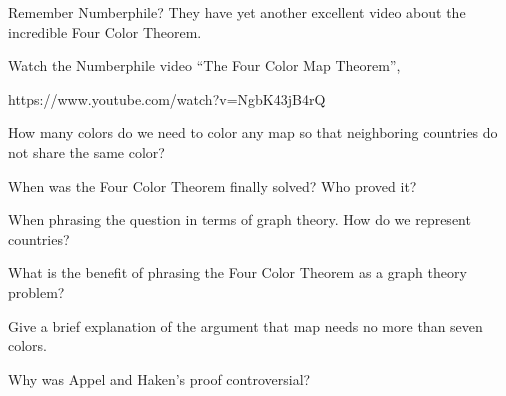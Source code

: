 Remember Numberphile? They have yet another excellent video about the incredible Four Color Theorem.

\begin{exercise}
Watch the Numberphile video “The Four Color Map Theorem”, \cite{numberphile_fourcolor}
\end{exercise} 
\footnotesize{https://www.youtube.com/watch?v=NgbK43jB4rQ}

\newpage

\begin{exercise}
How many colors do we need to color any map so that neighboring countries do not share the same color?
\end{exercise}

\blanks

\begin{exercise}
When was the Four Color Theorem finally solved? Who proved it?
\end{exercise} 

\blanks

\begin{exercise}
When phrasing the question in terms of graph theory. How do we represent countries? 
\end{exercise}

\blanks

\begin{exercise}
What is the benefit of phrasing the Four Color Theorem as a graph theory problem?
\end{exercise}

\blanks
\blanks

\begin{exercise}
Give a brief explanation of the argument that map needs no more than seven colors.
\end{exercise}

\blanks
\blanks

\begin{exercise}
Why was Appel and Haken’s proof controversial?
\end{exercise}

\blanks
\blanks






